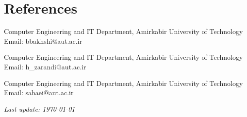 \documentclass[11pt,a4paper,sans]{moderncv} %
\begin{document}

\section{References}

{Computer Engineering and IT Department, Amirkabir University of Technology\\
Email: bbakhshi@aut.ac.ir
}

{Computer Engineering and IT Department, Amirkabir University of Technology\\
Email: h\_zarandi@aut.ac.ir
}

{Computer Engineering and IT Department, Amirkabir University of Technology\\
	Email: sabaei@aut.ac.ir
}

\vspace{2cm}
\centering\textit{Last update: \today}


%
%




\end{document}
